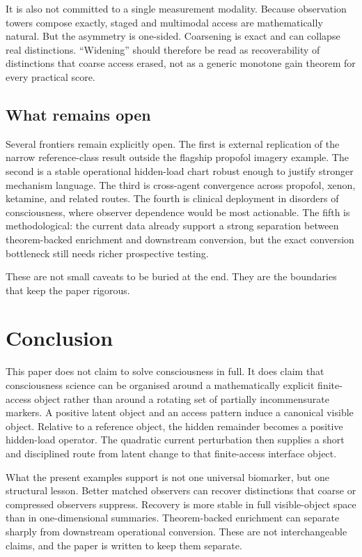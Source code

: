 \documentclass[11pt,a4paper]{article}
\numberwithin{equation}{section}
\theoremstyle{thmcompact}
\theoremstyle{remark}
\begin{document}
It is also not committed to a single measurement modality. Because observation towers compose exactly, staged and multimodal access are mathematically natural. But the asymmetry is one-sided. Coarsening is exact and can collapse real distinctions. ``Widening'' should therefore be read as recoverability of distinctions that coarse access erased, not as a generic monotone gain theorem for every practical score.

\subsection{What remains open}

Several frontiers remain explicitly open. The first is external replication of the narrow reference-class result outside the flagship propofol imagery example. The second is a stable operational hidden-load chart robust enough to justify stronger mechanism language. The third is cross-agent convergence across propofol, xenon, ketamine, and related routes. The fourth is clinical deployment in disorders of consciousness, where observer dependence would be most actionable. The fifth is methodological: the current data already support a strong separation between theorem-backed enrichment and downstream conversion, but the exact conversion bottleneck still needs richer prospective testing.

These are not small caveats to be buried at the end. They are the boundaries that keep the paper rigorous.

\section{Conclusion}
\label{sec:conclusion}

This paper does not claim to solve consciousness in full. It does claim that consciousness science can be organised around a mathematically explicit finite-access object rather than around a rotating set of partially incommensurate markers. A positive latent object and an access pattern induce a canonical visible object. Relative to a reference object, the hidden remainder becomes a positive hidden-load operator. The quadratic current perturbation then supplies a short and disciplined route from latent change to that finite-access interface object.

What the present examples support is not one universal biomarker, but one structural lesson. Better matched observers can recover distinctions that coarse or compressed observers suppress. Recovery is more stable in full visible-object space than in one-dimensional summaries. Theorem-backed enrichment can separate sharply from downstream operational conversion. These are not interchangeable claims, and the paper is written to keep them separate.
\end{document}
